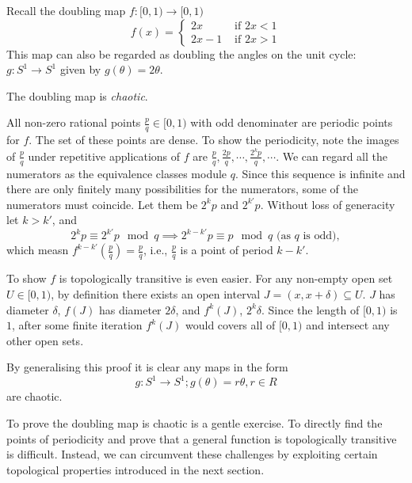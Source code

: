 \begin{example}\label{ex_doubling_map}
	Recall the doubling map $f: [0,1) \rightarrow [0,1)$
	\begin{equation}\label{eq:doubling_map}
	f(x) = 
		\begin{cases}
			2x &\text{ if } 2x < 1 \\
			2x -1 &\text{ if } 2x > 1
		\end{cases}
	\end{equation}
	This map can also be regarded as doubling the angles on the unit cycle: $g: S^1 \rightarrow S^1$ given by $ g(\theta) = 2 \theta$.
	
	The doubling map is \textit{chaotic}.

	All non-zero rational points $\frac{p}{q} \in [0,1)$ with odd denominater are periodic points for $f$. 
	The set of these points are dense.
	To show the periodicity, note the images of $\frac{p}{q}$ under repetitive applications of $f$ are $\frac{p}{q}, \frac{2p}{q}, \cdots, \frac{2^k p}{q}, \cdots$.
	We can regard all the numerators as the equivalence classes module $q$.
	Since this sequence is infinite and there are only finitely many possibilities for the numerators, some of the numerators must coincide. Let them be $2^k p$ and $2^{k'} p$. 
	Without loss of generacity let $k > k'$, and
	$$
	2^k p \equiv 2^{k'} p \mod q \implies 
	2^{k-k'} p \equiv p \mod q \text{ (as $q$ is odd)},
	$$
	which measn $f^{k-k'}(\frac{p}{q}) = \frac{p}{q}$, i.e., $\frac{p}{q}$ is a point of period $k - k'$.

	To show $f$ is topologically transitive is even easier. 
	For any non-empty open set $U \in [0,1)$, by definition there exists an open interval $J = (x, x+ \delta) \subseteq U$. 
	$J$ has diameter $\delta$, $f(J)$ has diameter $2 \delta$, and $f^k(J)$, $2^k \delta$. 
	Since the length of $[0,1)$ is $1$, after some finite iteration $f^k(J)$ would covers all of $[0,1)$ and intersect any other open sets.

	By generalising this proof it is clear any maps in the form 
	$$
	g: S^1 \rightarrow S^1; g(\theta) = r \theta, r \in R
	$$
	are chaotic.
\end{example}

To prove the doubling map is chaotic is a gentle exercise. 
To directly find the points of periodicity and prove that a general function is topologically transitive is difficult.
Instead, we can circumvent these challenges by exploiting certain topological properties introduced in the next section.


